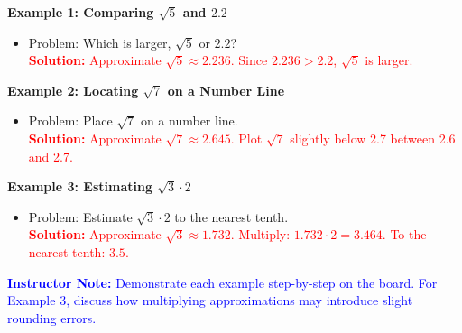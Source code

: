 \documentclass[12pt]{article}
\begin{document}
\begin{tcolorbox}[colframe=black!60, colback=white, 
coltitle=black, colbacktitle=black!15, fonttitle=\bfseries\Large, 
title=Examples, halign title=center, left=10pt, right=10pt, top=10pt, bottom=15pt]
\textbf{Example 1: Comparing \( \sqrt{5} \) and \( 2.2 \)}
\begin{itemize}
    \item Problem: Which is larger, \( \sqrt{5} \) or \( 2.2 \)?\\
    \textcolor{red}{\textbf{Solution:} Approximate \( \sqrt{5} \approx 2.236 \). Since \( 2.236 > 2.2 \), \( \sqrt{5} \) is larger.}
\end{itemize}

\textbf{Example 2: Locating \( \sqrt{7} \) on a Number Line}
\begin{itemize}
    \item Problem: Place \( \sqrt{7} \) on a number line.\\
    \textcolor{red}{\textbf{Solution:} Approximate \( \sqrt{7} \approx 2.645 \). Plot \( \sqrt{7} \) slightly below 2.7 between 2.6 and 2.7.}
\end{itemize}

\textbf{Example 3: Estimating \( \sqrt{3} \cdot 2 \)}
\begin{itemize}
    \item Problem: Estimate \( \sqrt{3} \cdot 2 \) to the nearest tenth.\\
    \textcolor{red}{\textbf{Solution:} Approximate \( \sqrt{3} \approx 1.732 \). Multiply: \( 1.732 \cdot 2 = 3.464 \). To the nearest tenth: \( 3.5 \).}
\end{itemize}

\textcolor{blue}{\textbf{Instructor Note:}} \textcolor{blue}{Demonstrate each example step-by-step on the board. For Example 3, discuss how multiplying approximations may introduce slight rounding errors.}
\end{tcolorbox}
\end{document}
